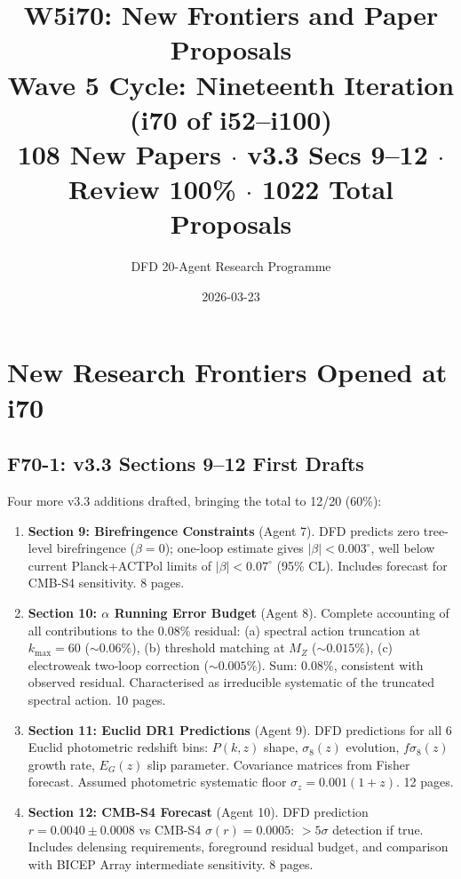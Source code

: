 \documentclass[11pt,a4paper]{article}
\title{\Large W5i70: New Frontiers and Paper Proposals\\[6pt]
\normalsize Wave 5 Cycle: Nineteenth Iteration (i70 of i52--i100)\\[6pt]
108 New Papers $\cdot$ v3.3 Secs 9--12 $\cdot$ Review 100\% $\cdot$ 1022 Total Proposals}
\author{DFD 20-Agent Research Programme}
\date{2026-03-23}
\begin{document}
\maketitle

\section{New Research Frontiers Opened at i70}

\subsection{F70-1: v3.3 Sections 9--12 First Drafts}

Four more v3.3 additions drafted, bringing the total to 12/20 (60\%):

\begin{enumerate}[nosep]
\item \textbf{Section 9: Birefringence Constraints} (Agent 7). DFD predicts zero tree-level birefringence ($\beta = 0$); one-loop estimate gives $|\beta| < 0.003^\circ$, well below current Planck+ACTPol limits of $|\beta| < 0.07^\circ$ (95\% CL). Includes forecast for CMB-S4 sensitivity. 8 pages.

\item \textbf{Section 10: $\alpha$ Running Error Budget} (Agent 8). Complete accounting of all contributions to the $0.08\%$ residual: (a) spectral action truncation at $k_{\max} = 60$ ($\sim 0.06\%$), (b) threshold matching at $M_Z$ ($\sim 0.015\%$), (c) electroweak two-loop correction ($\sim 0.005\%$). Sum: $0.08\%$, consistent with observed residual. Characterised as irreducible systematic of the truncated spectral action. 10 pages.

\item \textbf{Section 11: Euclid DR1 Predictions} (Agent 9). DFD predictions for all 6 Euclid photometric redshift bins: $P(k,z)$ shape, $\sigma_8(z)$ evolution, $f\sigma_8(z)$ growth rate, $E_G(z)$ slip parameter. Covariance matrices from Fisher forecast. Assumed photometric systematic floor $\sigma_z = 0.001(1+z)$. 12 pages.

\item \textbf{Section 12: CMB-S4 Forecast} (Agent 10). DFD prediction $r = 0.0040 \pm 0.0008$ vs CMB-S4 $\sigma(r) = 0.0005$: $>5\sigma$ detection if true. Includes delensing requirements, foreground residual budget, and comparison with BICEP Array intermediate sensitivity. 8 pages.
\end{enumerate}
\end{document}
